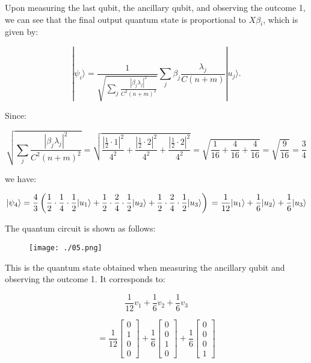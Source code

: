 \documentclass[12pt]{article}
\begin{document}
Upon measuring the last qubit, the ancillary qubit, and observing the outcome 1, we can see that the final output quantum state is proportional to $X\beta_{i}$, which is given by:

$$
|\psi_{i}\rangle=\frac{1}{\sqrt{\sum_{j} \frac{|\beta_{j} \lambda_{j}|^{2}}{C^{2}(n+m)^{2}}}} \sum_{j} \beta_{j} \frac{\lambda_{j}}{C(n+m)}|u_{j}\rangle .
$$

Since:

$$
\sqrt{\sum_{j} \frac{|\beta_{j} \lambda_{j}|^{2}}{C^{2}(n+m)^{2}}} = \sqrt{\frac{|\frac{1}{2} \cdot 1|^{2}}{4^2} + \frac{|\frac{1}{2} \cdot 2|^{2}}{4^2} + \frac{|\frac{1}{2} \cdot 2|^{2}}{4^2}} = \sqrt{\frac{1}{16} + \frac{4}{16} + \frac{4}{16}} = \sqrt{\frac{9}{16}} = \frac{3}{4}
$$

we have:

$$
|\psi_{4}\rangle=\frac{4}{3}\left(\frac{1}{2} \cdot \frac{1}{4}\cdot \frac{1}{2}|u_{1}\rangle + \frac{1}{2} \cdot \frac{2}{4}\cdot \frac{1}{2}|u_{2}\rangle + \frac{1}{2} \cdot \frac{2}{4}\cdot \frac{1}{2}|u_{3}\rangle\right) \\

= \frac{1}{12}|u_{1}\rangle + \frac{1}{6}|u_{2}\rangle + \frac{1}{6}|u_{3}\rangle
$$

The quantum circuit is shown as follows:

\begin{figure}[ht]
\begin{center}
\texttt{[image: ./05.png]} 
\end{center}
\end{figure}
    
This is the quantum state obtained when measuring the ancillary qubit and observing the outcome 1. It corresponds to:

$$
\frac{1}{12}v_1 + \frac{1}{6}v_2 + \frac{1}{6}v_3
$$

$$
= \frac{1}{12}\begin{bmatrix}
0 \\
1 \\
0 \\
0
\end{bmatrix} + \frac{1}{6}\begin{bmatrix}
0 \\
0 \\
1 \\
0
\end{bmatrix} + \frac{1}{6}\begin{bmatrix}
0 \\
0 \\
0 \\
1
\end{bmatrix}
$$
\end{document}
